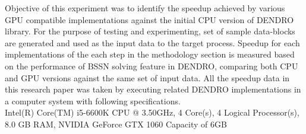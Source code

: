 Objective of this experiment was to identify the speedup achieved by various GPU compatible implementations against the initial CPU version of DENDRO library. For the purpose of testing and experimenting, set of sample data-blocks are generated and used as the input data to the target process. Speedup for each implementations of the each step in the methodology section is measured based on the performance of BSSN solving feature in DENDRO, comparing both CPU and GPU versions against the same set of input data. All the speedup data in this research paper was taken by executing related DENDRO implementations in a computer system with following specifications.
\\
Intel(R) Core(TM) i5-6600K CPU @ 3.50GHz, 4 Core(s), 4 Logical Processor(s), 8.0 GB RAM, NVIDIA GeForce GTX 1060 Capacity of 6GB